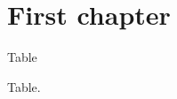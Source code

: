 \documentclass{book}
\begin{document}
\chapter{First chapter}
\begin{table}[p]
\caption{Table}
Table.
\end{table}
\clearpage
{}
\printpostnotes
\end{document}

